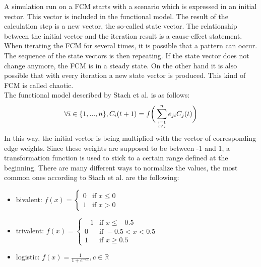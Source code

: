 \documentclass[conference]{IEEEtran}
\begin{document}
A simulation run on a FCM starts with a scenario which is expressed in an initial vector. This vector is included in the functional model. The result of the calculation step is a new vector, the so-called state vector. The relationship between the initial vector and the iteration result is a cause-effect statement.\\
When iterating the FCM for several times, it is possible that a pattern can occur. The sequence of the state vectors is then repeating. If the state vector does not change anymore, the FCM is in a steady state. On the other hand it is also possible that with every iteration a new state vector is produced. This kind of FCM is called chaotic.\\
The functional model described by Stach et al. \cite{stach2005} is as follows:\\
\begin{equation}
\forall i \in \{1,...,n\},C_{i}(t+1) = f  \bigg(\sum_{i=1 \atop i \neq j}^{n} e_{ji}C_{j}(t)\bigg)
\end{equation}
In this way, the initial vector is being multiplied with the vector of corresponding edge weights. Since these weights are supposed to be between -1 and 1, a transformation function is used to stick to a certain range defined at the beginning. There are many different ways to normalize the values, the most common ones according to Stach et al. \cite{stach2005} are the following:
\begin{itemize}
\item bivalent: \begin{math} f(x) = \begin{cases} 
0 & \text{if } x \leqslant 0\\ 
1 & \text{if } x > 0
\end{cases} \end{math}
\item trivalent: \begin{math} f(x) = \begin{cases}
-1 & \text{if } x \leqslant -0.5\\
0 & \text{if } -0.5 < x < 0.5\\
1 & \text{if } x \geqslant 0.5
\end{cases} \end{math}
\item logistic: \begin{math} f(x) = \frac{1}{1+e^{-cx}}, c \in \mathbb{R} \end{math}
\end{itemize}
\end{document}
